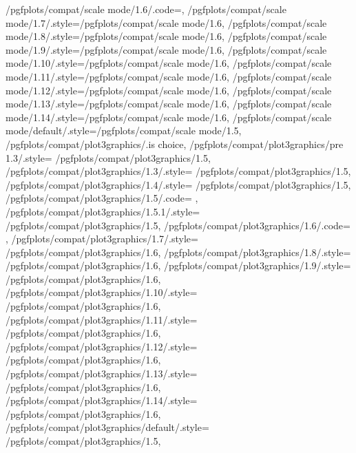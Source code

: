 {	/pgfplots/compat/scale mode/1.6/.code=\def\pgfplots@compat@scale@mode@compatible@mode{0},
	/pgfplots/compat/scale mode/1.7/.style={/pgfplots/compat/scale mode/1.6},
	/pgfplots/compat/scale mode/1.8/.style={/pgfplots/compat/scale mode/1.6},
	/pgfplots/compat/scale mode/1.9/.style={/pgfplots/compat/scale mode/1.6},
	/pgfplots/compat/scale mode/1.10/.style={/pgfplots/compat/scale mode/1.6},
	/pgfplots/compat/scale mode/1.11/.style={/pgfplots/compat/scale mode/1.6},
	/pgfplots/compat/scale mode/1.12/.style={/pgfplots/compat/scale mode/1.6},
	/pgfplots/compat/scale mode/1.13/.style={/pgfplots/compat/scale mode/1.6},
	/pgfplots/compat/scale mode/1.14/.style={/pgfplots/compat/scale mode/1.6},
	/pgfplots/compat/scale mode/default/.style={/pgfplots/compat/scale mode/1.5},
	/pgfplots/compat/plot3graphics/.is choice,
	/pgfplots/compat/plot3graphics/pre 1.3/.style=	{/pgfplots/compat/plot3graphics/1.5},
	/pgfplots/compat/plot3graphics/1.3/.style=		{/pgfplots/compat/plot3graphics/1.5},
	/pgfplots/compat/plot3graphics/1.4/.style=		{/pgfplots/compat/plot3graphics/1.5},%
	/pgfplots/compat/plot3graphics/1.5/.code=		{\def\b@pgfplots@compat@plot@graphics@threedim{1}},%
	/pgfplots/compat/plot3graphics/1.5.1/.style=	{/pgfplots/compat/plot3graphics/1.5},%
	/pgfplots/compat/plot3graphics/1.6/.code=		{\def\b@pgfplots@compat@plot@graphics@threedim{2}},%
	/pgfplots/compat/plot3graphics/1.7/.style=	{/pgfplots/compat/plot3graphics/1.6},%
	/pgfplots/compat/plot3graphics/1.8/.style=	{/pgfplots/compat/plot3graphics/1.6},%
	/pgfplots/compat/plot3graphics/1.9/.style=	{/pgfplots/compat/plot3graphics/1.6},%
	/pgfplots/compat/plot3graphics/1.10/.style=	{/pgfplots/compat/plot3graphics/1.6},%
	/pgfplots/compat/plot3graphics/1.11/.style=	{/pgfplots/compat/plot3graphics/1.6},%
	/pgfplots/compat/plot3graphics/1.12/.style=	{/pgfplots/compat/plot3graphics/1.6},%
	/pgfplots/compat/plot3graphics/1.13/.style=	{/pgfplots/compat/plot3graphics/1.6},%
	/pgfplots/compat/plot3graphics/1.14/.style=	{/pgfplots/compat/plot3graphics/1.6},%
	/pgfplots/compat/plot3graphics/default/.style=	{/pgfplots/compat/plot3graphics/1.5},%
}
